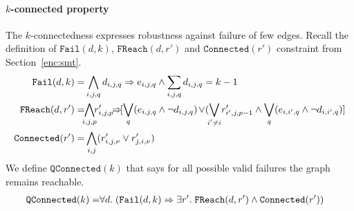 \paragraph{$k$-connected property}
%
The $k$-connectedness expresses robustness against failure of few edges.
%
%
%
Recall the definition of $\texttt{Fail}(d,k)$, $\texttt{FReach}(d,r')$ and $\texttt{Connected}(r')$ constraint from Section~\ref{enc:smt}.
\begin{align*}
\texttt{Fail}(d,k) = & 
\bigwedge\limits_{i,j,q} d_{i,j,q} \limplies e_{i,j,q}  \land 
\sum_{i,j,q} d_{i,j,q} = k-1\\
\texttt{FReach}(d,r') = &\hspace{-1ex}
\bigwedge\limits_{i,j,p}  \hspace{-1ex}r^{\prime}_{i,j,p} \hspace{-1ex}\limplies\hspace{-1ex} [\bigvee_{q} (e_{i,j,q} \land  \neg d_{i,j,q}) \hspace{-1pt}\lor \hspace{-2pt} (\bigvee_{\mathclap{i' \neq i}}  r^{\prime}_{i',j,p-1} \land  \bigvee_{q} (e_{i,i',q} \land \neg d_{i,i',q}) ]\\
\texttt{Connected}(r') = & \Land\limits_{i,j} (r^{\prime}_{i,j,\nu} \lor r^{\prime}_{j,i,\nu})
\end{align*}
%
We define $\texttt{QConnected}(k)$ that says for all possible valid failures
the graph remains reachable. 
\begin{align*}
\texttt{QConnected}(k) = & \forall d.\;
(\texttt{Fail}(d,k) \Rightarrow \exists r'.\;\texttt{FReach}(d,r')
\land \texttt{Connected}(r'))
\end{align*}
